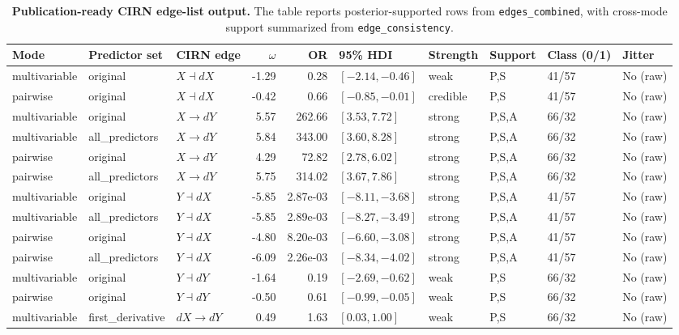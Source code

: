 \begin{table}[t!]
\centering
\caption{\textbf{Publication-ready CIRN edge-list output.} The table reports posterior-supported rows from \texttt{edges\_combined}, with cross-mode support summarized from \texttt{edge\_consistency}.}
\label{tab:cirn_publication_edge_table}
\scriptsize
\setlength{\tabcolsep}{2.2pt}
\renewcommand{\arraystretch}{1.05}
\begin{tabular}{@{}lp{}p{}rrp{}llll@{}}
\toprule
Mode & Predictor set & CIRN edge & $\omega$ & OR & 95\% HDI & Strength & Support & Class (0/1) & Jitter \\
\midrule
multivariable & original & $X \dashv dX$ & -1.29 & 0.28 & $[-2.14, -0.46]$ & weak & P,S & 41/57 & No (raw) \\
pairwise & original & $X \dashv dX$ & -0.42 & 0.66 & $[-0.85, -0.01]$ & credible & P,S & 41/57 & No (raw) \\
multivariable & original & $X \longrightarrow dY$ & 5.57 & 262.66 & $[3.53, 7.72]$ & strong & P,S,A & 66/32 & No (raw) \\
multivariable & all\_predictors & $X \longrightarrow dY$ & 5.84 & 343.00 & $[3.60, 8.28]$ & strong & P,S,A & 66/32 & No (raw) \\
pairwise & original & $X \longrightarrow dY$ & 4.29 & 72.82 & $[2.78, 6.02]$ & strong & P,S,A & 66/32 & No (raw) \\
pairwise & all\_predictors & $X \longrightarrow dY$ & 5.75 & 314.02 & $[3.67, 7.86]$ & strong & P,S,A & 66/32 & No (raw) \\
multivariable & original & $Y \dashv dX$ & -5.85 & 2.87e-03 & $[-8.11, -3.68]$ & strong & P,S,A & 41/57 & No (raw) \\
multivariable & all\_predictors & $Y \dashv dX$ & -5.85 & 2.89e-03 & $[-8.27, -3.49]$ & strong & P,S,A & 41/57 & No (raw) \\
pairwise & original & $Y \dashv dX$ & -4.80 & 8.20e-03 & $[-6.60, -3.08]$ & strong & P,S,A & 41/57 & No (raw) \\
pairwise & all\_predictors & $Y \dashv dX$ & -6.09 & 2.26e-03 & $[-8.34, -4.02]$ & strong & P,S,A & 41/57 & No (raw) \\
multivariable & original & $Y \dashv dY$ & -1.64 & 0.19 & $[-2.69, -0.62]$ & weak & P,S & 66/32 & No (raw) \\
pairwise & original & $Y \dashv dY$ & -0.50 & 0.61 & $[-0.99, -0.05]$ & weak & P,S & 66/32 & No (raw) \\
multivariable & first\_derivative & $dX \longrightarrow dY$ & 0.49 & 1.63 & $[0.03, 1.00]$ & weak & P,S & 66/32 & No (raw) \\

\end{tabular}
\end{table}
